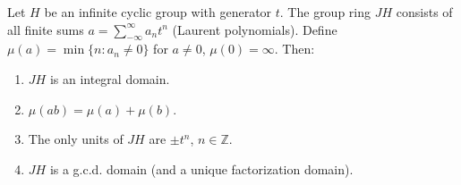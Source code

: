 Let $H$ be an infinite cyclic group with generator $t$. The group ring $JH$ consists of all finite sums $a = \sum_{-\infty}^{\infty} a_n t^n$ (Laurent polynomials). Define $\mu(a) = \min\{n : a_n \neq 0\}$ for $a \neq 0$, $\mu(0) = \infty$. Then:
\begin{enumerate}
\item $JH$ is an integral domain.
\item $\mu(ab) = \mu(a) + \mu(b)$.
\item The only units of $JH$ are $\pm t^n$, $n \in \mathbb{Z}$.
\item $JH$ is a g.c.d. domain (and a unique factorization domain).
\end{enumerate}
